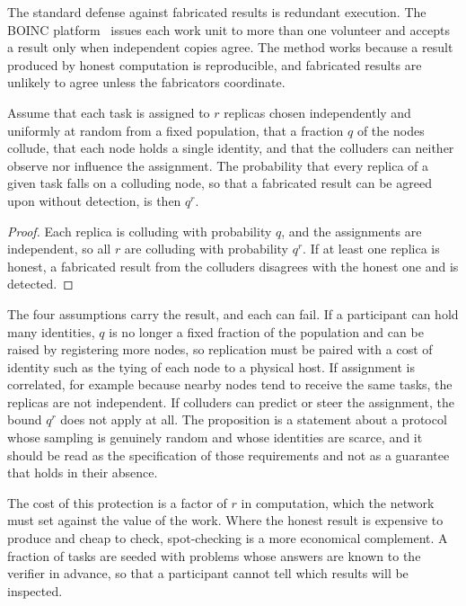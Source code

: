 The standard defense against fabricated results is redundant execution. The BOINC platform~\cite{anderson2004} issues each work unit to more than one volunteer and accepts a result only when independent copies agree. The method works because a result produced by honest computation is reproducible, and fabricated results are unlikely to agree unless the fabricators coordinate.

\begin{proposition}
\label{prop:replication}
Assume that each task is assigned to $r$ replicas chosen independently and uniformly at random from a fixed population, that a fraction $q$ of the nodes collude, that each node holds a single identity, and that the colluders can neither observe nor influence the assignment. The probability that every replica of a given task falls on a colluding node, so that a fabricated result can be agreed upon without detection, is then $q^{r}$.
\end{proposition}

\begin{proof}
Each replica is colluding with probability $q$, and the assignments are independent, so all $r$ are colluding with probability $q^{r}$. If at least one replica is honest, a fabricated result from the colluders disagrees with the honest one and is detected.
\end{proof}

The four assumptions carry the result, and each can fail. If a participant can hold many identities, $q$ is no longer a fixed fraction of the population and can be raised by registering more nodes, so replication must be paired with a cost of identity such as the tying of each node to a physical host. If assignment is correlated, for example because nearby nodes tend to receive the same tasks, the replicas are not independent. If colluders can predict or steer the assignment, the bound $q^{r}$ does not apply at all. The proposition is a statement about a protocol whose sampling is genuinely random and whose identities are scarce, and it should be read as the specification of those requirements and not as a guarantee that holds in their absence.

The cost of this protection is a factor of $r$ in computation, which the network must set against the value of the work. Where the honest result is expensive to produce and cheap to check, spot-checking is a more economical complement. A fraction of tasks are seeded with problems whose answers are known to the verifier in advance, so that a participant cannot tell which results will be inspected.

